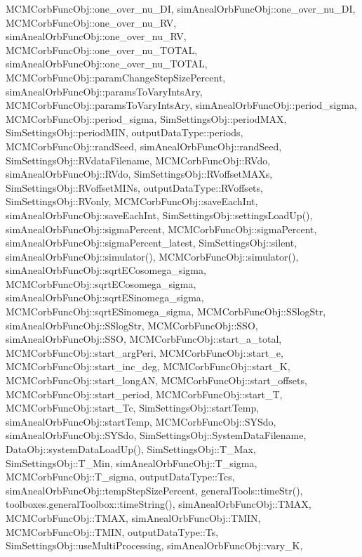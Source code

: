 M\-C\-M\-Corb\-Func\-Obj\-::one\-\_\-over\-\_\-nu\-\_\-\-D\-I, sim\-Aneal\-Orb\-Func\-Obj\-::one\-\_\-over\-\_\-nu\-\_\-\-D\-I, M\-C\-M\-Corb\-Func\-Obj\-::one\-\_\-over\-\_\-nu\-\_\-\-R\-V, sim\-Aneal\-Orb\-Func\-Obj\-::one\-\_\-over\-\_\-nu\-\_\-\-R\-V, M\-C\-M\-Corb\-Func\-Obj\-::one\-\_\-over\-\_\-nu\-\_\-\-T\-O\-T\-A\-L, sim\-Aneal\-Orb\-Func\-Obj\-::one\-\_\-over\-\_\-nu\-\_\-\-T\-O\-T\-A\-L, M\-C\-M\-Corb\-Func\-Obj\-::param\-Change\-Step\-Size\-Percent, sim\-Aneal\-Orb\-Func\-Obj\-::params\-To\-Vary\-Ints\-Ary, M\-C\-M\-Corb\-Func\-Obj\-::params\-To\-Vary\-Ints\-Ary, sim\-Aneal\-Orb\-Func\-Obj\-::period\-\_\-sigma, M\-C\-M\-Corb\-Func\-Obj\-::period\-\_\-sigma, Sim\-Settings\-Obj\-::period\-M\-A\-X, Sim\-Settings\-Obj\-::period\-M\-I\-N, output\-Data\-Type\-::periods, M\-C\-M\-Corb\-Func\-Obj\-::rand\-Seed, sim\-Aneal\-Orb\-Func\-Obj\-::rand\-Seed, Sim\-Settings\-Obj\-::\-R\-Vdata\-Filename, M\-C\-M\-Corb\-Func\-Obj\-::\-R\-Vdo, sim\-Aneal\-Orb\-Func\-Obj\-::\-R\-Vdo, Sim\-Settings\-Obj\-::\-R\-Voffset\-M\-A\-Xs, Sim\-Settings\-Obj\-::\-R\-Voffset\-M\-I\-Ns, output\-Data\-Type\-::\-R\-Voffsets, Sim\-Settings\-Obj\-::\-R\-Vonly, M\-C\-M\-Corb\-Func\-Obj\-::save\-Each\-Int, sim\-Aneal\-Orb\-Func\-Obj\-::save\-Each\-Int, Sim\-Settings\-Obj\-::settings\-Load\-Up(), sim\-Aneal\-Orb\-Func\-Obj\-::sigma\-Percent, M\-C\-M\-Corb\-Func\-Obj\-::sigma\-Percent, sim\-Aneal\-Orb\-Func\-Obj\-::sigma\-Percent\-\_\-latest, Sim\-Settings\-Obj\-::silent, sim\-Aneal\-Orb\-Func\-Obj\-::simulator(), M\-C\-M\-Corb\-Func\-Obj\-::simulator(), sim\-Aneal\-Orb\-Func\-Obj\-::sqrt\-E\-Cosomega\-\_\-sigma, M\-C\-M\-Corb\-Func\-Obj\-::sqrt\-E\-Cosomega\-\_\-sigma, sim\-Aneal\-Orb\-Func\-Obj\-::sqrt\-E\-Sinomega\-\_\-sigma, M\-C\-M\-Corb\-Func\-Obj\-::sqrt\-E\-Sinomega\-\_\-sigma, M\-C\-M\-Corb\-Func\-Obj\-::\-S\-Slog\-Str, sim\-Aneal\-Orb\-Func\-Obj\-::\-S\-Slog\-Str, M\-C\-M\-Corb\-Func\-Obj\-::\-S\-S\-O, sim\-Aneal\-Orb\-Func\-Obj\-::\-S\-S\-O, M\-C\-M\-Corb\-Func\-Obj\-::start\-\_\-a\-\_\-total, M\-C\-M\-Corb\-Func\-Obj\-::start\-\_\-arg\-Peri, M\-C\-M\-Corb\-Func\-Obj\-::start\-\_\-e, M\-C\-M\-Corb\-Func\-Obj\-::start\-\_\-inc\-\_\-deg, M\-C\-M\-Corb\-Func\-Obj\-::start\-\_\-\-K, M\-C\-M\-Corb\-Func\-Obj\-::start\-\_\-long\-A\-N, M\-C\-M\-Corb\-Func\-Obj\-::start\-\_\-offsets, M\-C\-M\-Corb\-Func\-Obj\-::start\-\_\-period, M\-C\-M\-Corb\-Func\-Obj\-::start\-\_\-\-T, M\-C\-M\-Corb\-Func\-Obj\-::start\-\_\-\-Tc, Sim\-Settings\-Obj\-::start\-Temp, sim\-Aneal\-Orb\-Func\-Obj\-::start\-Temp, M\-C\-M\-Corb\-Func\-Obj\-::\-S\-Y\-Sdo, sim\-Aneal\-Orb\-Func\-Obj\-::\-S\-Y\-Sdo, Sim\-Settings\-Obj\-::\-System\-Data\-Filename, Data\-Obj\-::system\-Data\-Load\-Up(), Sim\-Settings\-Obj\-::\-T\-\_\-\-Max, Sim\-Settings\-Obj\-::\-T\-\_\-\-Min, sim\-Aneal\-Orb\-Func\-Obj\-::\-T\-\_\-sigma, M\-C\-M\-Corb\-Func\-Obj\-::\-T\-\_\-sigma, output\-Data\-Type\-::\-Tcs, sim\-Aneal\-Orb\-Func\-Obj\-::temp\-Step\-Size\-Percent, general\-Tools\-::time\-Str(), toolboxes.\-general\-Toolbox\-::time\-String(), sim\-Aneal\-Orb\-Func\-Obj\-::\-T\-M\-A\-X, M\-C\-M\-Corb\-Func\-Obj\-::\-T\-M\-A\-X, sim\-Aneal\-Orb\-Func\-Obj\-::\-T\-M\-I\-N, M\-C\-M\-Corb\-Func\-Obj\-::\-T\-M\-I\-N, output\-Data\-Type\-::\-Ts, Sim\-Settings\-Obj\-::use\-Multi\-Processing, sim\-Aneal\-Orb\-Func\-Obj\-::vary\-\_\-\-K, 